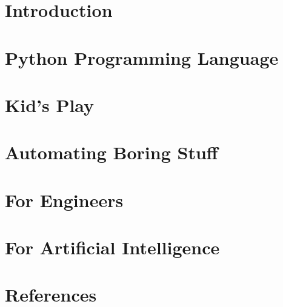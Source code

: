 \section[Intro]{Introduction}


\section[Syntax]{Python Programming Language}

 
\section[Kids]{Kid's Play}



\section[Auto]{Automating Boring Stuff}

 
\section[Eng]{For Engineers}

 
\section[AI]{For Artificial Intelligence}


 \section[Refs]{References}



